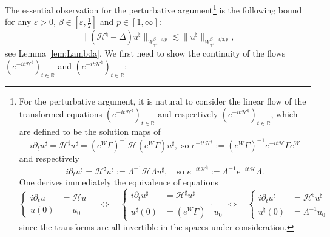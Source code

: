 The essential observation for the perturbative argument\footnote{For the perturbative argument, it is natural to consider the linear
  flow of the transformed equations $(e^{- i t \mathcal{H}^{\sharp}})_{t \in
  \mathbb{R}}$ and respectively $(e^{- i t \mathcal{H}^{\natural}})_{t \in
  \mathbb{R}}$, which are defined to be the solution maps of
  \begin{equation}
    i \partial_t u^{\sharp} = \mathcal{H}^{\sharp} u^{\sharp} = (e^W
    \Gamma)^{- 1} \mathcal{H} (e^W \Gamma) u^{\sharp}, \text{ so } e^{- i t
    \mathcal{H}^{\sharp}} := (e^W \Gamma)^{- 1} e^{- i t \mathcal{H}}
    \Gamma e^W \label{def:eisharp}
  \end{equation}
  and respectively
  \begin{equation}
    i \partial_t u^{\natural} = \mathcal{H}^{\natural} u^{\natural} :=
    \Lambda^{- 1} \mathcal{H} \Lambda u^{\sharp}, \quad \text{so } e^{- i t
    \mathcal{H}^{\natural}} := \Lambda^{- 1} e^{- i t \mathcal{H}}
    \Lambda . \label{def:einatural}
  \end{equation}
  One derives immediately the equivalence of equations
  \[ \left\{\begin{array}{ll}
       i \partial_t u & = \mathcal{H} u\\
       u (0) & = u_0
     \end{array}\right. \quad \Leftrightarrow \quad \left\{\begin{array}{ll}
       i \partial_t u^{\sharp} & = \mathcal{H}^{\sharp} u^{\sharp}\\
       u^{\sharp} (0) & = (e^W \Gamma)^{- 1} u_0
     \end{array}\right. \Leftrightarrow \quad \left\{\begin{array}{ll}
       i \partial_t u^{\natural} & = \mathcal{H}^{\natural} u^{\natural}\\
       u^{\natural} (0) & = \Lambda^{- 1} u_0
     \end{array}\right. \]
  since the transforms are all invertible in the spaces under consideration.} is the following bound
for any $\varepsilon > 0$, $\beta \in [\varepsilon, \frac{1}{2}]$ and $p \in [1,
\infty]$:
\begin{equation}
  \| (\mathcal{H}^{\natural} - \Delta) u^{\natural}
  \|_{W_{\mathbb{T}^3}^{\beta - \varepsilon, p}} \lesssim \| u^{\natural}
  \|_{W_{\mathbb{T}^3 }^{\beta + 3 / 2, p}}, \label{eq:pertu-H-sharp}
\end{equation}
see Lemma \ref{lem:Lambda}. We first need to show the continuity of the flows $(e^{- i t
\mathcal{H}^{\sharp}})_{t \in \mathbb{R}}$ and $(e^{- i t
\mathcal{H}^{\natural}})_{t \in \mathbb{R}}$:

